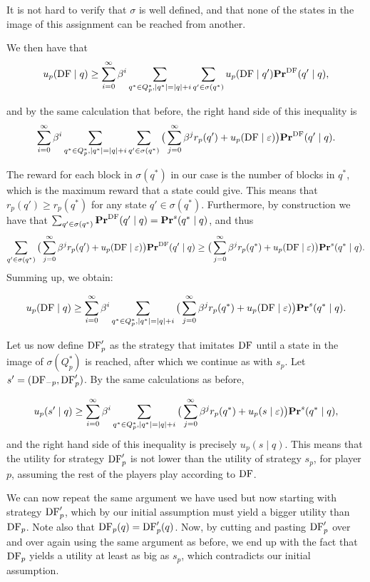 It is not hard to verify that $\sigma$ is well defined, and that none of 
the states in the image of this assignment can be reached from another. 

We then have that 
$$u_p( \text{\rm DF} \mid q) \geq \sum_{i=0}^\infty \beta^i \sum_{q^* \in Q^*_p, |q^*| = |q| + i} \sum_{q' \in \sigma(q^*)} 
u_p(\text{\rm DF} \mid q')  \mathbf{Pr}^{\text{\rm DF}}(q' \mid q), $$

and by the same calculation that before, the right hand side of this inequality is 
$$\sum_{i=0}^\infty \beta^i \sum_{q^* \in Q^*_p, |q^*| = |q| + i} \sum_{q' \in \sigma(q^*)}  \big(\sum_{j = 0}^\infty \beta^j r_p(q') + u_p(\text{\rm DF} \mid \varepsilon)\big) \mathbf{Pr}^{\text{\rm DF}}(q' \mid q).$$

The reward for each block in $\sigma(q^*)$ in our case is the number of blocks in $q^*$, which is the maximum reward that a state could give. This means that $r_p(q') \geq r_p(q^*)$ for any state $q' \in \sigma(q^*)$. 
Furthermore,  by construction we have that 
$\sum_{q' \in \sigma(q^*)} \mathbf{Pr}^{\text{\rm DF}}(q' \mid q) = \mathbf{Pr}^s(q^* \mid q)$, and thus 
$$\sum_{q' \in \sigma(q^*)} \big(\sum_{j = 0}^\infty \beta^j r_p(q') + u_p(\text{\rm DF} \mid \varepsilon)\big) \mathbf{Pr}^{\text{\rm DF}}(q' \mid q) \geq \big(\sum_{j = 0}^\infty \beta^j r_p(q^*) + u_p(\text{\rm DF} \mid \varepsilon)\big) \mathbf{Pr}^s(q^* \mid q).$$ 
Summing up, we obtain: 

$$u_p( \text{\rm DF} \mid q) \geq \sum_{i=0}^\infty \beta^i \sum_{q^* \in Q^*_p, |q^*| = |q| + i} \big(\sum_{j = 0}^\infty \beta^j r_p(q^*) + u_p(\text{\rm DF} \mid \varepsilon)\big)  \mathbf{Pr}^s(q^* \mid q).$$

Let us now define $\text{\rm DF}'_p$ as the strategy that imitates $\text{\rm DF}$ until a state in the image of $\sigma(Q^*_p)$ is reached, after which 
we continue as with $s_p$. Let $s' = (\text{\rm DF}_{-p},\text{\rm DF}'_p)$. By the same calculations as before, 

$$u_p(s' \mid q) \geq \sum_{i=0}^\infty \beta^i \sum_{q^* \in Q^*_p, |q^*| = |q| + i} \big(\sum_{j = 0}^\infty \beta^j r_p(q^*) + u_p(s \mid \varepsilon)\big)  \mathbf{Pr}^s(q^* \mid q), $$
and the right hand side of this inequality is precisely $u_p(s \mid q)$. This means that the utility for strategy $\text{\rm DF}'_p$ is not lower than the utility of strategy $s_p$, for player $p$, assuming the rest of the players play according to $\text{\rm DF}$. 

We can now repeat the same argument we have used but now starting with strategy $\text{\rm DF}'_p$, which by our initial assumption must yield 
a bigger utility than $\text{\rm DF}_p$. Note also that $\text{\rm DF}_p(q) = \text{\rm DF}_p'(q)$. 
Now, by cutting and pasting $\text{\rm DF}'_p$ over and over again using the same argument as before, we end up with the fact that $\text{\rm DF}_p$ yields 
a utility at least as big as $s_p$, which contradicts our initial assumption. 

